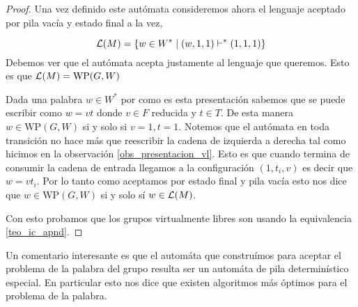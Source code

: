 \documentclass[tesis.tex]{subfiles}
\begin{document}
\begin{proof}
	Una vez definido este autómata consideremos ahora el lenguaje aceptado por pila vacía y estado final a la vez,
	
	\[
	{\cal L }(M) = \{  w \in W^* \mid (w,1,1)   \vdash^*  (1, 1, 1)  \}
	\]
	Debemos ver que el autómata acepta justamente al lenguaje que queremos. 
	Esto es que $ {\cal L }(M) = \text{WP}(G,W) $ 
	
	
	Dada una palabra $w \in W^*$ por como es esta presentación sabemos que se puede escribir como $w = vt$ donde $v \in F$ reducida y $t \in  T$. 
	De esta manera $w \in \text{WP}(G,W)$ si y solo si $v=1, t=1$.
	Notemos que el autómata en toda transición no hace más que reescribir la cadena de izquierda a derecha tal como hicimos en la observación \ref{obs_presentacion_vl}.
	Esto es que cuando termina de consumir la cadena de entrada llegamos a la configuración $(1, t_i, v)$ es decir que $w = vt_i$.
	Por lo tanto como aceptamos por estado final y pila vacía esto nos dice que $w \in \text{WP}(G,W)$ si y solo sí $w \in {\cal L}(M)$.
	
	Con esto probamos que los grupos virtualmente libres son \ic usando la equivalencia \ref{teo_ic_apnd}.
	
\end{proof}

Un comentario interesante es que el automáta que construímos para aceptar el problema de la palabra del grupo \vl resulta ser un automáta de pila determinístico especial.
En particular esto nos dice que existen algoritmos más óptimos para el problema de la palabra.
\end{document}
